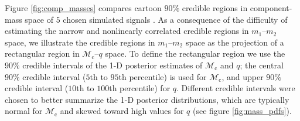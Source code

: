 Figure \ref{fig:comp_masses} compares cartoon $90\%$ credible regions in component-mass space of $5$ chosen simulated signals \citep[cf.][figure 1]{Chatziioannou_2014}.  As a consequence of the difficulty of estimating the narrow and nonlinearly correlated credible regions in $m_1$--$m_2$ space, we illustrate the credible regions in $m_1$--$m_2$ space as the projection of a rectangular region in $\mathcal{M}_\mathrm{c}$--$q$ space.  To define the rectangular region we use the $90\%$ credible intervals of the 1-D posterior estimates of $\mathcal{M}_\mathrm{c}$ and $q$; the central $90\%$ credible interval ($5$th to $95$th percentile) is used for $\mathcal{M}_\mathrm{c}$, and upper $90\%$ credible interval ($10$th to $100$th percentile) for $q$.  Different credible intervals were chosen to better summarize the 1-D posterior distributions, which are typically normal for $\mathcal{M}_\mathrm{c}$ and skewed toward high values for $q$ (see figure \ref{fig:mass_pdfs}).